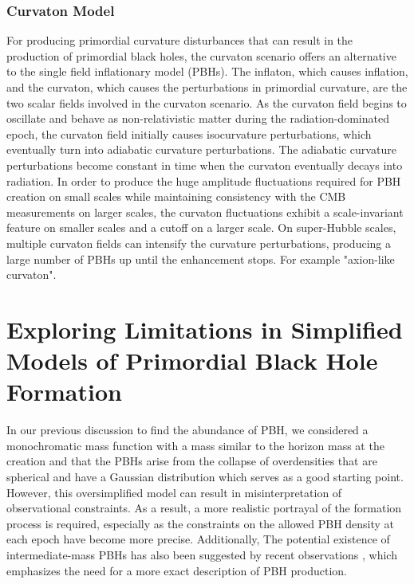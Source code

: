 \subsubsection{Curvaton Model}
For producing primordial curvature disturbances that can result in the production of primordial black holes, the curvaton scenario offers an alternative to the single field inflationary model (PBHs). The inflaton, which causes inflation, and the curvaton, which causes the perturbations in primordial curvature, are the two scalar fields involved in the curvaton scenario. As the curvaton field begins to oscillate and behave as non-relativistic matter during the radiation-dominated epoch, the curvaton field initially causes isocurvature perturbations, which eventually turn into adiabatic curvature perturbations. The adiabatic curvature perturbations become constant in time when the curvaton eventually decays into radiation\cite{Lyth_2005}. In order to produce the huge amplitude fluctuations required for PBH creation on small scales while maintaining consistency with the CMB measurements on larger scales, the curvaton fluctuations exhibit a scale-invariant feature on smaller scales and a cutoff on a larger scale. On super-Hubble scales, multiple curvaton fields can intensify the curvature perturbations, producing a large number of PBHs up until the enhancement stops. For example "axion-like curvaton\cite{PhysRevD.87.063519}".















\section{Exploring Limitations in Simplified Models of Primordial Black Hole Formation} \label{limtiation}
In our previous discussion to find the abundance of PBH, we considered a monochromatic mass function with a mass similar to the horizon mass at the creation and that the PBHs arise from the collapse of overdensities that are spherical and have a Gaussian distribution which serves as a good starting point. However, this oversimplified model can result in misinterpretation of observational constraints. As a result,  a more realistic portrayal of the formation process is required, especially as the constraints on the allowed PBH density at each epoch have become more precise. Additionally, The potential existence of intermediate-mass PBHs has also been suggested by recent observations \cite{2016PhRvL.116t1301B}, which emphasizes the need for a more exact description of PBH production.
